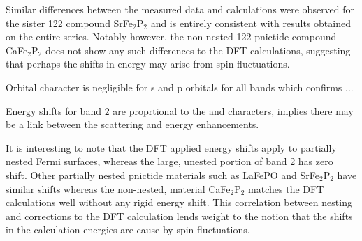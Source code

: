 Similar differences between the measured data and calculations were observed for the sister 122 compound SrFe$_2$P$_2$\cite{Analytis2009} and is entirely consistent with results obtained on the entire \BaFePAs series\cite{Shishido2010}. Notably however, the non-nested 122 pnictide compound CaFe$_2$P$_2$ does not show any such differences to the DFT calculations, suggesting that perhaps the shifts in energy may arise from spin-fluctuations.

Orbital character is negligible for s and p orbitals for all bands which confirms ...

Energy shifts for band $2$ are proprtional to the \DzTwo and \DxzDyz characters, implies there may be a link between the \kz scattering and energy enhancements.


It is interesting to note that the DFT applied energy shifts apply to partially nested Fermi surfaces, whereas the large, unested portion of band 2 has zero shift. Other partially nested pnictide materials such as LaFePO\cite{Carrington2009} and SrFe$_{2}$P$_{2}$\cite{Analytis2009} have similar shifts whereas the non-nested, material CaFe$_{2}$P$_{2}$\cite{Coldea2009} matches the DFT calculations well without any rigid energy shift. This correlation between nesting and corrections to the DFT calculation lends weight to the notion that the shifts in the calculation energies are cause by spin fluctuations.


